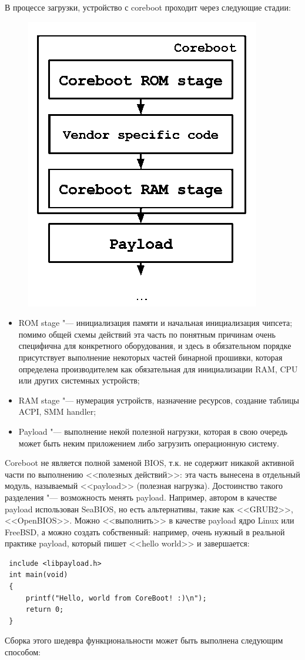 \documentclass[10pt, a5paper]{article}
\begin{document}
В процессе загрузки, устройство с coreboot проходит через следующие стадии:

\begin{figure}[h!]
  \centering
  \includegraphics[scale=0.4]{10_2015_fig1}
\end{figure}

\begin{itemize}
  \item ROM stage "--- инициализация памяти и начальная инициализация чипсета; помимо общей схемы действий эта часть по понятным причинам очень специфична для конкретного оборудования, и здесь в обязательном порядке присутствует выполнение некоторых частей бинарной прошивки, которая определена производителем как обязательная для инициализации RAM, CPU или других системных устройств;
  \item RAM stage "--- нумерация устройств, назначение ресурсов, создание таблицы ACPI, SMM handler;
  \item Payload "--- выполнение некой полезной нагрузки, которая в \linebreak свою очередь может быть неким приложением либо загрузить операционную систему.
\end{itemize}

Coreboot не является полной заменой BIOS, т.к. не содержит никакой активной части по выполнению <<полезных действий>>: эта часть вынесена в отдельный модуль, называемый <<payload>> (полезная нагрузка). Достоинство такого разделения "--- возможность менять payload. Например, автором в качестве payload использован SeaBIOS, но есть альтернативы, такие как <<GRUB2>>, <<OpenBIOS>>. Можно <<выполнить>> в качестве payload ядро Linux или FreeBSD, а можно создать собственный: например, очень нужный в реальной практике payload, который пишет <<hello world>> и завершается:
\begin{verbatim}
 include <libpayload.h>
 int main(void)
 {
     printf("Hello, world from CoreBoot! :)\n");
     return 0;
 }
\end{verbatim}
Сборка этого шедевра функциональности может быть выполнена следующим способом:
\end{document}
